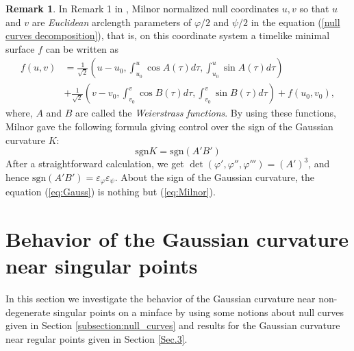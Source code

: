 \documentclass[11pt,reqno]{amsart}
\theoremstyle{plain} %
\theoremstyle{definition}
\newtheorem{remark}[theorem]{Remark}
\begin{document}

\begin{remark}\label{Milnor's study}
In Remark 1 in \cite{Milnor2}, 
Milnor normalized null coordinates $u, v$ so that $u$ and $v$ are \emph{Euclidean} arclength parameters of $\varphi/2$ and $\psi/2$ in the equation (\ref{null curves decomposition}), that is, on this coordinate system a timelike minimal surface $f$ can be written as 
\begin{align*}
f(u,v)&=\frac{1}{\sqrt{2}}\left(u-u_0, \int^u_{u_0}\cos A(\tau)d\tau, \int^u_{u_0}\sin A(\tau)d\tau \right) \nonumber\\
&+\frac{1}{\sqrt{2}}\left(v-v_0, \int^v_{v_0}\cos B(\tau)d\tau, \int^v_{v_0}\sin B(\tau)d\tau \right)+f(u_0,v_0),
\end{align*}
where, $A$ and $B$ are called the {\it Weierstrass functions}. By using these functions, Milnor gave the following formula giving control over the sign of the Gaussian curvature $K$:
\begin{equation}\label{eq:Milnor}
\mathrm{sgn}K=\mathrm{sgn}(A'B')
\end{equation}
After a straightforward calculation, we get $\det(\varphi', \varphi'', \varphi''')=(A')^3$, and hence $\mathrm{sgn}(A'B')=\varepsilon_\varphi \varepsilon_\psi$. About the sign of the Gaussian curvature, the equation (\ref{eq:Gauss}) is nothing but (\ref{eq:Milnor}). %
\end{remark}

\section{Behavior of the Gaussian curvature near singular points}\label{Sec.4}
In this section we investigate the behavior of the Gaussian curvature near non-degenerate singular points on a minface by using some notions about null curves given in Section \ref{subsection:null_curves} and results for the Gaussian curvature near regular points given in Section \ref{Sec.3}. 
\end{document}

